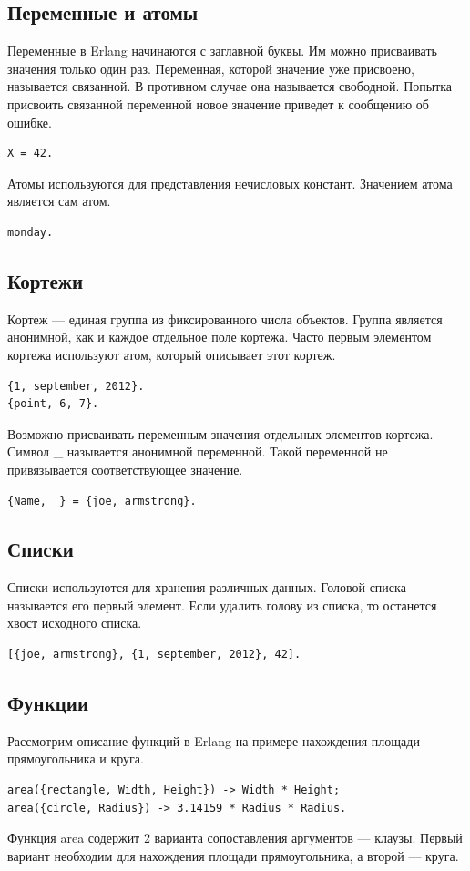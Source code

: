 		\subsection{Переменные и атомы} 
			Переменные в Erlang начинаются с заглавной буквы. Им можно присваивать значения только один раз. 
			Переменная, которой значение уже присвоено, называется связанной. В противном случае она называется свободной. 
			Попытка присвоить связанной переменной новое значение приведет к сообщению об ошибке.
			\begin{lstlisting}
X = 42.
			\end{lstlisting}

			Атомы используются для представления нечисловых констант. Значением атома является сам атом.
			\begin{lstlisting}
monday.
			\end{lstlisting}  

		\subsection{Кортежи}
			Кортеж --- единая группа из фиксированного числа объектов. Группа является анонимной, как и каждое отдельное 
			поле кортежа. Часто первым элементом кортежа используют атом, который описывает этот кортеж.
			\begin{lstlisting}
{1, september, 2012}.
{point, 6, 7}.
			\end{lstlisting}
			
			Возможно присваивать переменным значения отдельных элементов кортежа. Символ \_ называется анонимной переменной. 
			Такой переменной не привязывается соответствующее значение.
			\begin{lstlisting}
{Name, _} = {joe, armstrong}.
			\end{lstlisting} 

		\subsection{Списки} 
			Списки используются для хранения различных данных. Головой списка называется его первый элемент. Если удалить 
			голову из списка, то останется хвост исходного списка.
			\begin{lstlisting}
[{joe, armstrong}, {1, september, 2012}, 42].
			\end{lstlisting}

		\subsection{Функции}
			Рассмотрим описание функций в Erlang на примере нахождения площади прямоугольника и круга.
			\begin{lstlisting}
area({rectangle, Width, Height}) -> Width * Height;
area({circle, Radius}) -> 3.14159 * Radius * Radius.
			\end{lstlisting}
			Функция area содержит 2 варианта сопоставления аргументов --- клаузы. Первый вариант необходим для нахождения 
			площади прямоугольника, а второй --- круга. 	
			
